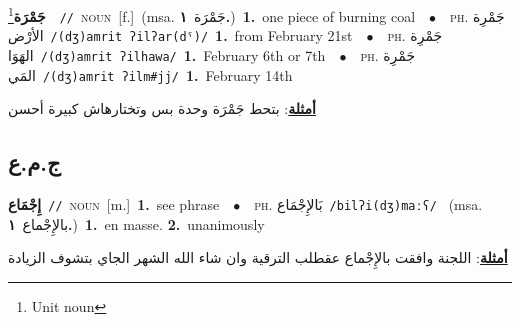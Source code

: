 \documentclass[10pt,a4paper,twoside]{article} %
\begin{document}
\begin{multicols}{2}
{\setlength\topsep{0pt}\textbf{\foreignlanguage{arabic}{جَمْرَة}}\footnote{Unit noun}\ \ {\color{gray}\texttt{//}\color{black}}\ \textsc{noun}\ [f.]\ \color{gray}(msa. \foreignlanguage{arabic}{جَمْرَة}~\foreignlanguage{arabic}{\textbf{١.}})\color{black}\ \textbf{1.}~one piece of burning coal\ \ $\bullet$\ \ \textsc{ph.} \color{gray} \foreignlanguage{arabic}{جَمْرِة الأرْض}\color{black}\ {\color{gray}\texttt{/{\sffamily (dʒ)amrit ʔilʔar(dˤ)}/}\color{black}}\ \textbf{1.}~from February 21st\ \ $\bullet$\ \ \textsc{ph.} \color{gray} \foreignlanguage{arabic}{جَمْرِة الهَوَا}\color{black}\ {\color{gray}\texttt{/{\sffamily (dʒ)amrit ʔilhawa}/}\color{black}}\ \textbf{1.}~February 6th or 7th\ \ $\bullet$\ \ \textsc{ph.} \color{gray} \foreignlanguage{arabic}{جَمْرِة المَي}\color{black}\ {\color{gray}\texttt{/{\sffamily (dʒ)amrit ʔilm\#jj}/}\color{black}}\ \textbf{1.}~February 14th\  \begin{flushright}\color{gray}\foreignlanguage{arabic}{\textbf{\underline{\foreignlanguage{arabic}{أمثلة}}}: بتحط جَمْرَة وحدة بس وتختارهاش كبيرة أحسن}\end{flushright}\color{black}} \vspace{2mm}

\vspace{-3mm}
\subsection*{\color{blue}\foreignlanguage{arabic}{ج.م.ع}\color{blue}{}} 

{\setlength\topsep{0pt}\textbf{\foreignlanguage{arabic}{إِجْمَاع}}\ {\color{gray}\texttt{//}\color{black}}\ \textsc{noun}\ [m.]\ \textbf{1.}~see phrase\ \ $\bullet$\ \ \textsc{ph.} \color{gray} \foreignlanguage{arabic}{بَالإِجْمَاع}\color{black}\ {\color{gray}\texttt{/{\sffamily bilʔi(dʒ)maːʕ}/}\color{black}}\ \color{gray} (msa. \foreignlanguage{arabic}{بالإِجْماع}~\foreignlanguage{arabic}{\textbf{١.}})\color{black}\ \textbf{1.}~en masse.  \textbf{2.}~unanimously\  \begin{flushright}\color{gray}\foreignlanguage{arabic}{\textbf{\underline{\foreignlanguage{arabic}{أمثلة}}}: اللجنة وافقت بالإِجْماع عقطلب الترقية وان شاء الله الشهر الجاي بتشوف الزيادة}\end{flushright}\color{black}} \vspace{2mm}


\end{multicols}
\end{document}
